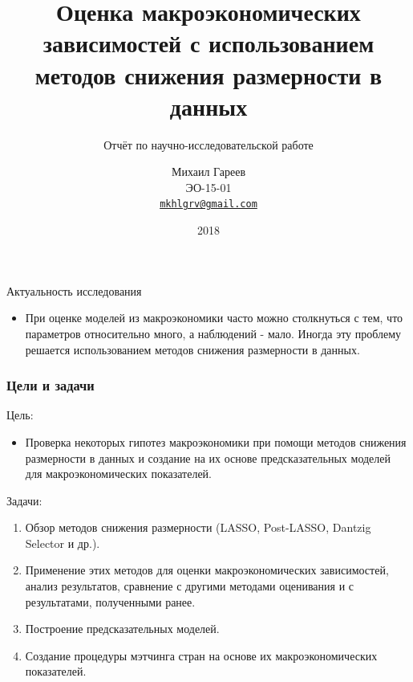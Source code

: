 \documentclass[c, dvipsnames]{beamer}  %
\title[МСР в макроэкономике]{Оценка макроэкономических зависимостей с использованием методов снижения размерности в данных}
\subtitle{Отчёт по научно-исследовательской работе}
\author[Михаил Гареев]{Михаил Гареев \\ \smallskip \scriptsize ЭО-15-01 \\ \smallskip \scriptsize \href{mailto:mkhlgrv@gmail.com}{\nolinkurl{mkhlgrv@gmail.com} }}
\institute[РАНХиГС]{ \uppercase{
  Российская Академия Народного Хозяйства и  \\ Государственной Службы при Президенте Российской Федерации}}
\date{2018}
\begin{document}
\frame[plain]{\titlepage}	%


\begin{frame}[c]{Актуальность исследования} 
\begin{itemize}
\item  При оценке моделей из макроэкономики часто можно столкнуться с тем, что параметров относительно много, а наблюдений - мало. Иногда эту проблему решается использованием \alert{методов снижения размерности в данных}.
\end{itemize}
\end{frame}




\begin{frame}[shrink=3]
	\frametitle{Цели и задачи}
	\begin{block}{Цель:}
	\begin{itemize}
		\item  Проверка некоторых гипотез макроэкономики при помощи методов
снижения размерности в данных и создание на их основе предсказательных моделей
для макроэкономических показателей.
	\end{itemize}
		
	\end{block}

	 	\begin{block}{Задачи:}
			\begin{enumerate}
	\item Обзор методов снижения размерности (LASSO, Post-LASSO, Dantzig Selector и др.).
\item Применение этих методов для оценки макроэкономических
зависимостей, анализ результатов, сравнение с другими методами оценивания и с
результатами, полученными ранее. 
\item Построение предсказательных моделей.
\item Создание процедуры мэтчинга стран на основе их макроэкономических показателей.
	 \end{enumerate}	
	\end{block}
\end{frame}
\end{document}
